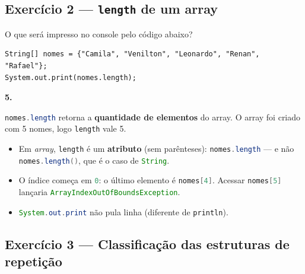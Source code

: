 \documentclass[12pt,a4paper]{article}
\newcommand{\codigo}[1]{\lstinline[language=Java,basicstyle=\ttfamily\small]|#1|}
\begin{document}
\subsection{Exercício 2 --- \texttt{length} de um array}

\begin{exercicio}
O que será impresso no console pelo código abaixo?

\begin{lstlisting}
String[] nomes = {"Camila", "Venilton", "Leonardo", "Renan", "Rafael"};
System.out.print(nomes.length);
\end{lstlisting}
\end{exercicio}

\begin{resolucao}
\textbf{5.}

\codigo{nomes.length} retorna a \textbf{quantidade de elementos} do array. O
array foi criado com 5 nomes, logo \codigo{length} vale 5.

\begin{itemize}
  \item Em \emph{array}, \codigo{length} é um \textbf{atributo} (sem parênteses):
        \codigo{nomes.length} --- e não \codigo{nomes.length()}, que é o caso de
        \codigo{String}.
  \item O índice começa em \codigo{0}: o último elemento é \codigo{nomes[4]}.
        Acessar \codigo{nomes[5]} lançaria \codigo{ArrayIndexOutOfBoundsException}.
  \item \codigo{System.out.print} não pula linha (diferente de \codigo{println}).
\end{itemize}
\end{resolucao}

\subsection{Exercício 3 --- Classificação das estruturas de repetição}
\end{document}
